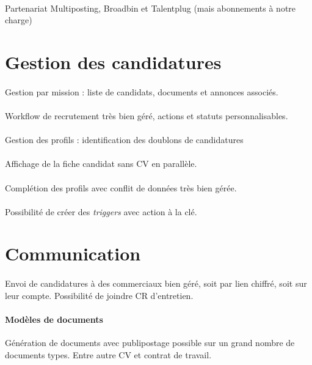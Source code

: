 \paragraph{} Partenariat Multiposting, Broadbin et Talentplug (mais abonnements à notre charge)




\section{Gestion des candidatures} 
\paragraph{} Gestion par mission : liste de candidats, documents et annonces associés.
\paragraph{} Workflow de recrutement très bien géré, actions et statuts personnalisables.
\paragraph{} Gestion des profils : identification des doublons de candidatures
\paragraph{} Affichage de la fiche candidat sans CV en parallèle.
\paragraph{} Complétion des profils avec conflit de données très bien gérée.
\paragraph{} Possibilité de créer des \textit{triggers} avec action à la clé.

\section{Communication}
\paragraph{} Envoi de candidatures à des commerciaux bien géré, soit par lien chiffré, soit sur leur compte. Possibilité de joindre CR d'entretien.
\paragraph{Modèles de documents} Génération de documents avec publipostage possible sur un grand nombre de documents types. Entre autre CV et contrat de travail.
